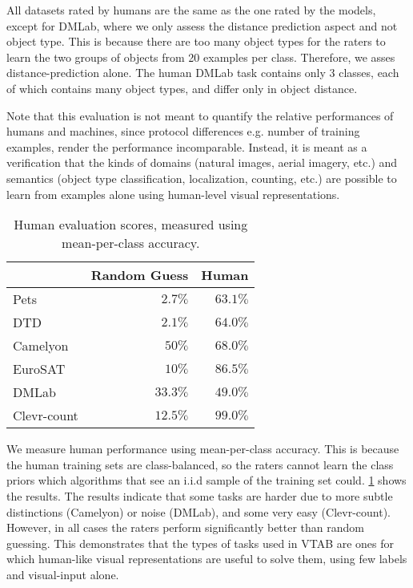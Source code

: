 \documentclass{article}
\begin{document}
All datasets rated by humans are the same as the one rated by the models, except for DMLab, where we only assess the distance prediction aspect and not object type. This is because there are too many object types for the raters to learn the two groups of objects from 20 examples per class. Therefore, we asses distance-prediction alone. The human DMLab task contains only 3 classes, each of which contains many object types, and differ only in object distance.

Note that this evaluation is not meant to quantify the relative performances of humans and machines, since protocol differences e.g. number of training examples, render the performance incomparable. Instead, it is meant as a verification that the kinds of domains (natural images, aerial imagery, etc.) and semantics (object type classification, localization, counting, etc.) are possible to learn from examples alone using human-level visual representations.

\begin{table}[h]
\centering
\begin{tabular}{lrr}
\toprule
& Random Guess & Human \\
\midrule
Pets & $2.7\%$ & $63.1\%$ \\
DTD  & $2.1\%$ & $64.0\%$  \\
Camelyon & $50\%$ & $68.0\%$  \\
EuroSAT & $10\%$ & $86.5\%$  \\
DMLab & $33.3\%$ & $49.0\%$  \\
Clevr-count & $12.5\%$  & $99.0\%$  \\
\bottomrule
\end{tabular}
\caption{
Human evaluation scores, measured using mean-per-class accuracy.
\label{tab:app-human}}
\end{table}

We measure human performance using mean-per-class accuracy. This is because the human training sets are class-balanced, so the raters cannot learn the class priors which algorithms that see an i.i.d sample of the training set could. \cref{tab:app-human} shows the results. The results indicate that some tasks are harder due to more subtle distinctions (Camelyon) or noise (DMLab), and some very easy (Clevr-count). However, in all cases the raters perform significantly better than random guessing. This demonstrates that the types of tasks used in VTAB are ones for which human-like visual representations are useful to solve them, using few labels and visual-input alone. 
\end{document}
